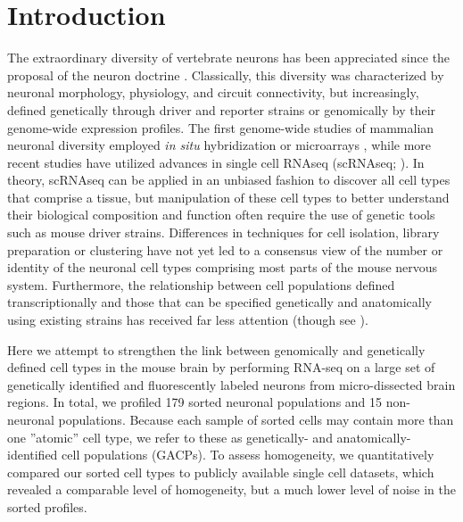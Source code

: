 \section*{Introduction}

The extraordinary diversity of vertebrate neurons has been appreciated since the proposal of the neuron doctrine \citep{Cajal_1888}. Classically, this diversity was characterized by neuronal morphology, physiology, and circuit connectivity, but increasingly, defined genetically through driver and reporter strains \cite{Gong_2003, Madisen_2009, Taniguchi_2011, Shima_2016} or genomically by their genome-wide expression profiles. The first genome-wide studies of mammalian neuronal diversity employed \textit{in situ} hybridization \citep{Lein_2006} or microarrays \cite{Sugino_2005, Doyle_2008}, while more recent studies have utilized advances in single cell RNAseq (scRNAseq; \citealt{Zeisel_2015, Zeisel_2018, Tasic_2016, Tasic_2018, Paul_2017}). In theory, scRNAseq can be applied in an unbiased fashion to discover all cell types that comprise a tissue, but manipulation of these cell types to better understand their biological composition and function often require the use of genetic tools such as mouse driver strains. Differences in techniques for cell isolation, library preparation or clustering have not yet led to a consensus view of the number or identity of the neuronal cell types comprising most parts of the mouse nervous system. Furthermore, the relationship between cell populations defined transcriptionally and those that can be specified genetically and anatomically using existing strains has received far less attention (though see \citealt{Tasic_2018}).    
 
Here we attempt to strengthen the link between genomically and genetically defined cell types in the mouse brain by performing RNA-seq on a large set of genetically identified and fluorescently labeled neurons from micro-dissected brain regions. In total, we profiled 179 sorted neuronal populations and 15 non-neuronal populations. Because each sample of sorted cells may contain more than one ”atomic” cell type, we refer to these as genetically- and anatomically-identified cell populations (GACPs). To assess homogeneity, we quantitatively compared our sorted cell types to publicly available single cell datasets, which revealed a comparable level of homogeneity, but a much lower level of noise in the sorted profiles.

